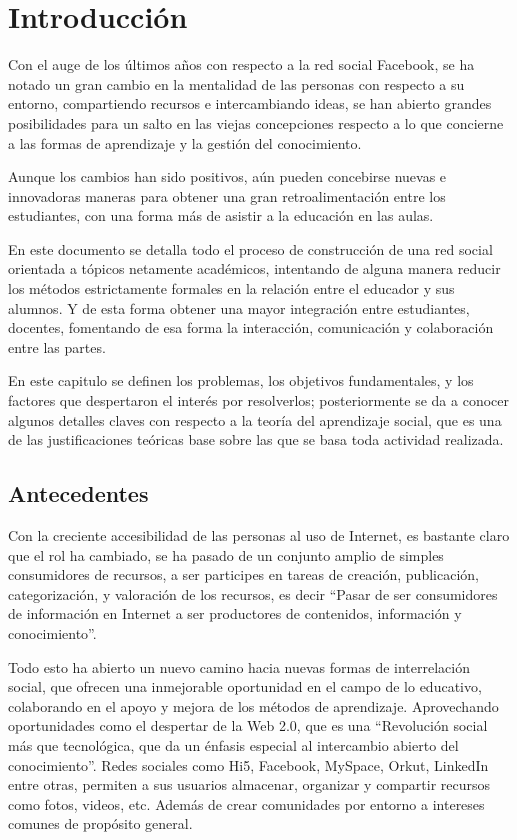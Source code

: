 \chapter{Introducción}

Con el auge de los últimos años con respecto a la red social Facebook\cite{Jeria}, se ha notado un gran cambio en la mentalidad de las personas con respecto a su entorno, compartiendo recursos e intercambiando ideas, se han abierto grandes posibilidades para un salto en las viejas concepciones respecto a lo que concierne a las formas de aprendizaje y la gestión del conocimiento.

Aunque los cambios han sido positivos, aún pueden concebirse nuevas e innovadoras maneras para obtener una gran retroalimentación entre los estudiantes, con una forma más de asistir a la educación en las aulas.

En este documento se detalla todo el proceso de construcción de una red social orientada a tópicos netamente académicos, intentando de alguna manera reducir los métodos estrictamente formales en la relación entre el educador y sus alumnos. Y de esta forma obtener una mayor integración entre estudiantes, docentes, fomentando de esa forma la interacción, comunicación y colaboración entre las partes.

En este capitulo se definen los problemas, los objetivos fundamentales, y los factores que despertaron el interés por resolverlos; posteriormente se da a conocer algunos detalles claves con respecto a la teoría del aprendizaje social, que es una de las justificaciones teóricas base sobre las que se basa toda actividad realizada.

\section{Antecedentes}
Con la creciente accesibilidad de las personas al uso de Internet, es bastante claro que el rol ha cambiado, se ha pasado de un conjunto amplio de simples consumidores de recursos, a ser participes en tareas de creación, publicación, categorización, y valoración de los recursos, es decir “Pasar de ser consumidores de información en Internet a ser productores de contenidos, información y conocimiento”\cite{Rodriguez}.

Todo esto ha abierto un nuevo camino hacia nuevas formas de interrelación social, que ofrecen una inmejorable oportunidad en el campo de lo educativo, colaborando en el apoyo y mejora de los métodos de aprendizaje. Aprovechando oportunidades como el despertar de la Web 2.0, que es una “Revolución social más que tecnológica, que da un énfasis especial al intercambio abierto del conocimiento”\cite{Rodriguez}. Redes sociales como Hi5, Facebook, MySpace, Orkut, LinkedIn entre otras, permiten a sus usuarios almacenar, organizar y compartir recursos como fotos, videos, etc. Además de crear comunidades por entorno a intereses comunes de propósito general.

